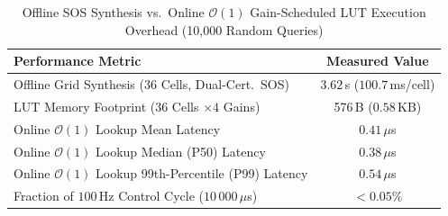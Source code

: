 \begin{table}[t]
\centering
\caption{Offline SOS Synthesis vs.\ Online $\mathcal{O}(1)$ Gain-Scheduled LUT Execution Overhead (10,000 Random Queries)}
\label{tab:lut_runtime}
\begin{tabular}{lc}
\toprule
Performance Metric & Measured Value \\
\midrule
Offline Grid Synthesis (36 Cells, Dual-Cert.\ SOS) & $3.62$\,s ($100.7$\,ms/cell) \\
LUT Memory Footprint (36 Cells $\times 4$ Gains) & 576\,B ($0.58$\,KB) \\
Online $\mathcal{O}(1)$ Lookup Mean Latency & $0.41\,\mu$s \\
Online $\mathcal{O}(1)$ Lookup Median (P50) Latency & $0.38\,\mu$s \\
Online $\mathcal{O}(1)$ Lookup 99th-Percentile (P99) Latency & $0.54\,\mu$s \\
Fraction of $100$\,Hz Control Cycle ($10\,000\,\mu$s) & $< 0.05\%$ \\
\bottomrule
\end{tabular}
\end{table}
